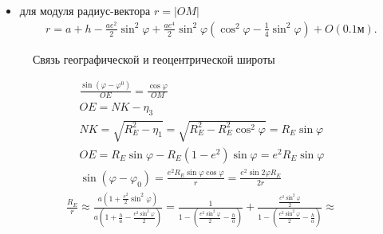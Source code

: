 \documentclass[a4paper,14pt]{article}
\theoremstyle{plain} %
\theoremstyle{definition} %
\theoremstyle{remark} %
\begin{document}
{\begin{itemize}
    \item
          для модуля радиус-вектора $r = |OM|$
          \begin{eqnarray*}
              r = a + h -\frac{ae^2}{2}\sin^2\varphi + \frac{ a e^4}{2} \sin^2 \varphi\left( \cos^2 \varphi - \frac{1}{4} \sin^2 \varphi \right)  + O(0.1 \mbox{м}).
          \end{eqnarray*}

\end{itemize}
\begin{figure}[H]
    \caption{Связь географической и геоцентрической широты}
    \label{fig:picture}
\end{figure}
\begin{align*}
    \frac{\sin(\varphi-\varphi^0)}{OE}=
    \frac{\cos\varphi}{OM}                                                \\
    OE=NK-\eta_3                                                          \\
    NK=\sqrt{R_E^2-\eta_1}=\sqrt{R_E^2-R_E^2\cos^2\varphi}=R_E\sin\varphi \\
    OE=R_E\sin\varphi-R_E(1-e^2)\sin\varphi=e^2R_E\sin\varphi             \\
    \sin(\varphi-\varphi_0)=\frac{e^2R_E\sin\varphi\cos\varphi}{r}=\frac{e^2\sin2\varphi R_E}{2r}
\end{align*}
\begin{align*}
    \frac{R_E}{r}\approx\frac{a(1+\frac{e^2}{2}\sin^2\varphi)}{a(1+\frac{h}{a}-\frac{e^2\sin^2\varphi}{2})}=
    \frac{1}{1-(\frac{e^2\sin^2\varphi}{2}-\frac{h}{a})}+\frac{\frac{e^2\sin^2\varphi}{2}}{1-(\frac{e^2\sin^2\varphi}{2}-\frac{h}{a})}\approx \\

\end{align*}}
\end{document}
